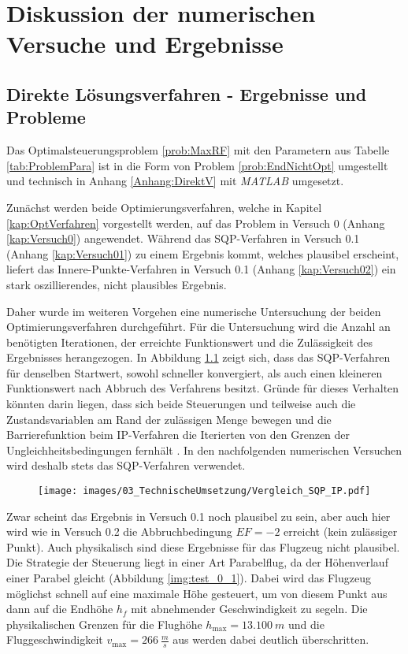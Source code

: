 \chapter{Diskussion der numerischen Versuche und Ergebnisse}\label{kap:LSG}

\section{Direkte Lösungsverfahren - Ergebnisse und Probleme}
Das Optimalsteuerungsproblem \ref{prob:MaxRF} mit den Parametern aus Tabelle \ref{tab:ProblemPara} ist in die Form von Problem \ref{prob:EndNichtOpt} umgestellt und technisch in Anhang \ref{Anhang:DirektV} mit \textit{MATLAB} umgesetzt.

Zunächst werden beide Optimierungsverfahren, welche in Kapitel \ref{kap:OptVerfahren} vorgestellt werden, auf das Problem in Versuch 0 (Anhang \ref{kap:Versuch0}) angewendet. Während das SQP-Verfahren in Versuch 0.1 (Anhang \ref{kap:Versuch01}) zu einem Ergebnis kommt, welches plausibel erscheint, liefert das Innere-Punkte-Verfahren in Versuch 0.1 (Anhang \ref{kap:Versuch02}) ein stark oszillierendes, nicht plausibles Ergebnis.

Daher wurde im weiteren Vorgehen eine numerische Untersuchung der beiden Optimierungsverfahren durchgeführt. Für die Untersuchung wird die Anzahl an benötigten Iterationen, der erreichte Funktionswert und die Zulässigkeit des Ergebnisses herangezogen. In Abbildung \ref{img:Vergleich_SQP_IP} zeigt sich, dass das SQP-Verfahren für denselben Startwert, sowohl schneller konvergiert, als auch einen kleineren Funktionswert nach Abbruch des Verfahrens besitzt. Gründe für dieses Verhalten könnten darin liegen, dass sich beide Steuerungen und teilweise auch die Zustandsvariablen am Rand der zulässigen Menge bewegen und die Barrierefunktion beim IP-Verfahren die Iterierten von den Grenzen der Ungleichheitsbedingungen fernhält \cite{Matlab2016}. In den nachfolgenden numerischen Versuchen wird deshalb stets das SQP-Verfahren verwendet.

\begin{figure}[htbp]
    \begin{center}
        \texttt{[image: images/03\_TechnischeUmsetzung/Vergleich\_SQP\_IP.pdf]}
         \label{img:Vergleich_SQP_IP}
    \end{center}
\end{figure}

Zwar scheint das Ergebnis in Versuch 0.1 noch plausibel zu sein, aber auch hier wird wie in Versuch 0.2 die Abbruchbedingung $EF = -2$ erreicht (kein zulässiger Punkt). Auch physikalisch sind diese Ergebnisse für das Flugzeug nicht plausibel. Die Strategie der Steuerung liegt in einer Art Parabelflug, da der Höhenverlauf einer Parabel gleicht (Abbildung \ref{img:test_0_1}). Dabei wird das Flugzeug möglichst schnell auf eine maximale Höhe gesteuert, um von diesem Punkt aus dann auf die Endhöhe $h_f$ mit abnehmender Geschwindigkeit zu segeln. Die physikalischen Grenzen für die Flughöhe $h_{\max} = 13.100 \ m$ und die Fluggeschwindigkeit $v_{\max} = 266 \ \frac{m}{s}$ aus \cite{A380Tech} werden dabei deutlich überschritten.

